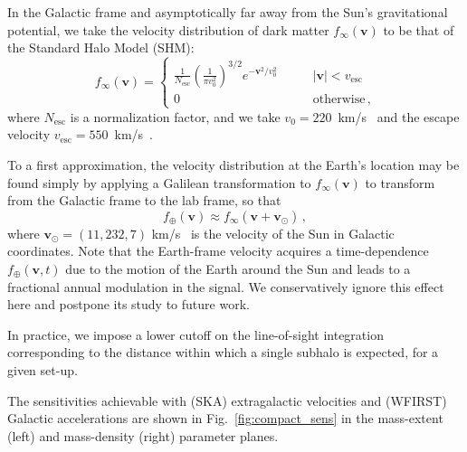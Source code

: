 \documentclass[prd,aps,10pt,nofootinbib,twocolumn,superscriptaddress,preprintnumbers,balancelastpage,longbibliography]{revtex4-1}
\newcommand{\vect}[1]{\boldsymbol{\mathbf{#1}}}
\newcommand{\sun}{\odot}
\newcommand{\vesc}{v_\text{esc}}
\begin{document}
In the Galactic frame and asymptotically far away from the Sun's gravitational potential, we take the velocity distribution of dark matter $f_\infty (\vect{v})$ to be that of the Standard Halo Model (SHM):
\begin{equation}{
 f_{\infty} (\vect{v}) = \left\{ \begin{array}{ll}
{\frac{1}{N_{\text{esc}}} } \left( {\frac{1}{\pi v_0^2}} \right)^{3/2} e^{- \vect{v}^2 / v_0^2 } \qquad &|\vect{v}| < \vesc \\
0 \, \qquad &\text{otherwise} \,,
\end{array}
\right.
} \label{eq:fvinfty}
\end{equation}
where $N_{\text{esc}}$ is a normalization factor, and we take $v_{0}=220$~km/s~\cite{Kerr:1986hz} and the escape velocity $\vesc=550$~km/s~\cite{Piffl:2013mla}.

To a first approximation, the velocity distribution at the Earth's location may be found simply by applying a Galilean transformation to $f_\infty (\vect{v})$ to transform from the Galactic frame to the lab frame, so that    
\begin{equation}
 f_\oplus (\vect{v}) \approx f_{\infty} \left( \vect{v} + \vect{v}_\sun \right) \,, \label{eq:fvoplus}
\end{equation}
where $\vect{v_\sun} = (11, 232, 7)$ km/s~\cite{Schoenrich:2009bx} is the velocity of the Sun in Galactic coordinates. Note that the Earth-frame velocity acquires a time-dependence $f_\oplus (\vect{v},t)$ due to the motion of the Earth around the Sun and leads to a fractional annual modulation in the signal. We conservatively ignore this effect here and postpone its study to future work.

In practice, we impose a lower cutoff on the line-of-sight integration corresponding to the distance within which a single subhalo is expected, for a given set-up.

The sensitivities achievable with (SKA) extragalactic velocities and (WFIRST) Galactic accelerations are shown in Fig.~\ref{fig:compact_sens} in the mass-extent (left) and mass-density (right) parameter planes.
\end{document}

